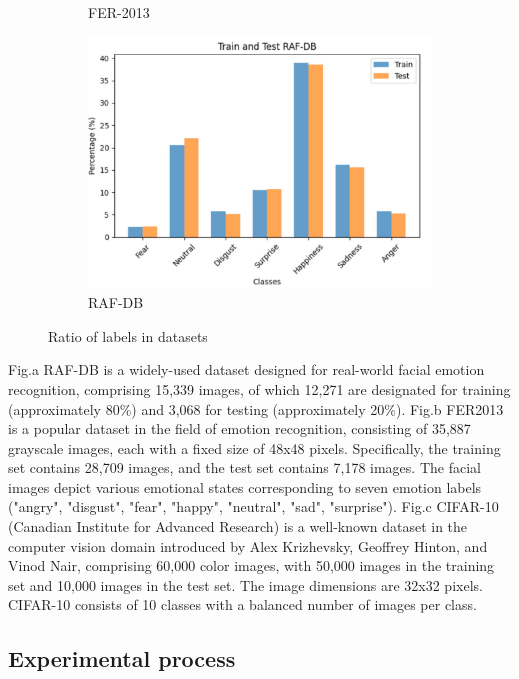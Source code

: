 \documentclass[pdflatex,sn-mathphys-num]{sn-jnl}%
\theoremstyle{thmstyleone}%
\theoremstyle{thmstyletwo}%
\theoremstyle{thmstylethree}%
\begin{document}
\begin{figure}[h]
\begin{subfigure}{0.3\textwidth}
        \caption{FER-2013}  
        \label{fig:fer-distribution}  
    \end{subfigure}  
    \hfill  
    \begin{subfigure}{0.3\textwidth}  
        \centering  
        \includegraphics[width=\linewidth]{Figures/RAFDB_Distribution.jpg}
        \caption{RAF-DB}  
        \label{fig:rafdb-distribution}  
    \end{subfigure}  
    \caption{Ratio of labels in datasets}  
    \label{fig:cifar-group}  
\end{figure}  
Fig.a RAF-DB is a widely-used dataset designed for real-world facial emotion recognition, comprising 15,339 images, of which 12,271 are designated for training (approximately 80\%) and 3,068 for testing (approximately 20\%). Fig.b FER2013 is a popular dataset in the field of emotion recognition, consisting of 35,887 grayscale images, each with a fixed size of 48x48 pixels. Specifically, the training set contains 28,709 images, and the test set contains 7,178 images. The facial images depict various emotional states corresponding to seven emotion labels ("angry", "disgust", "fear", "happy", "neutral", "sad", "surprise"). Fig.c CIFAR-10 (Canadian Institute for Advanced Research) is a well-known dataset in the computer vision domain introduced by Alex Krizhevsky, Geoffrey Hinton, and Vinod Nair, comprising 60,000 color images, with 50,000 images in the training set and 10,000 images in the test set. The image dimensions are 32x32 pixels. CIFAR-10 consists of 10 classes with a balanced number of images per class.


\subsection{Experimental process}
\end{document}
